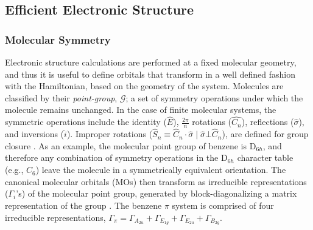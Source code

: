 \documentclass[letterpaper, 12pt]{article}
\begin{document}
\subsection{Efficient Electronic Structure} \label{Efficient Electronic Structure}
\subsubsection{Molecular Symmetry}

Electronic structure calculations are performed at a fixed molecular geometry, and thus it is useful to define orbitals that transform in a well defined fashion with the Hamiltonian, based on the geometry of the system. Molecules are classified by their \textit{point-group}, $\mathcal{G}$; a set of symmetry operations under which the molecule remains unchanged. In the case of finite molecular systems, the symmetric operations include the identity ($\hat{E}$), $\frac{2\pi}{n}$ rotations ($\hat{C_n}$), reflections ($\hat{\sigma}$), and inversions ($\hat{i}$). Improper rotations ($\hat{S}_n \equiv \hat{C}_n \cdot \hat{\sigma} \mid \hat{\sigma} \bot \hat{C}_n$),  are defined for group closure \cite{Abstract}. As an example, the molecular point group of benzene is D$_{6h}$, and therefore any combination of symmetry operations in the D$_{6h}$ character table (e.g., $\hat{C}_6$) leave the molecule in a symmetrically equivalent orientation. The canonical molecular orbitals (MOs) then transform as irreducible representations ($\Gamma_i$'s) of the molecular point group, generated by block-diagonalizing a matrix representation of the group \cite{212}. The benzene $\pi$ system is comprised of four irreducible representations, $\Gamma_{\pi} = \Gamma_{A_{2u}} + \Gamma_{E_{1g}} + \Gamma_{E_{2u}} + \Gamma_{B_{2g}}$.
\end{document}
